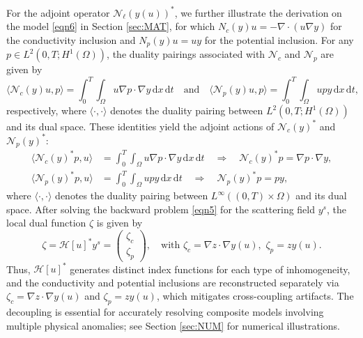 \documentclass[onefignum,onetabnum]{siamart190516}
\numberwithin{equation}{section}
\begin{document}
For the adjoint operator $\mathcal{N}_{\ell}(y(u))^{*}$, we further illustrate the derivation on the model \eqref{eqn6} in Section \ref{sec:MAT}, for which $N_{c}(y)u = -\nabla \cdot (u \nabla y)$ for the conductivity inclusion and $N_{p}(y)u = u y$ for the potential inclusion.
For any $p \in L^{2}(0,T; H^{1}(\Omega))$, the duality pairings associated with $\mathcal{N}_{c}$ and $\mathcal{N}_{p}$ are given by
\begin{equation*}
\langle \mathcal{N}_{c}(y)u, p \rangle = \int_{0}^{T} \int_{\Omega} u \nabla p \cdot \nabla y \, \mathrm{d}x \, \mathrm{d}t \quad \text{and} \quad \langle \mathcal{N}_{p}(y)u, p \rangle = \int_{0}^{T} \int_{\Omega} u p y \, \mathrm{d}x \, \mathrm{d}t,
\end{equation*}
respectively,
where $\langle \cdot, \cdot \rangle$ denotes the duality pairing between $L^{2}(0,T; H^{1}(\Omega))$ and its dual space.
These identities yield the adjoint actions of $\mathcal{N}_{c}(y)^{*}$ and $\mathcal{N}_{p}(y)^{*}$:
\begin{equation*}
\begin{aligned}
\langle \mathcal{N}_{c}(y)^{*} p, u \rangle &= \int_{0}^{T} \int_{\Omega} u \nabla p \cdot \nabla y \, \mathrm{d}x \, \mathrm{d}t \quad \Rightarrow \quad \mathcal{N}_{c}(y)^{*} p = \nabla p \cdot \nabla y, \\
\langle \mathcal{N}_{p}(y)^{*} p, u \rangle &= \int_{0}^{T} \int_{\Omega} u p y \, \mathrm{d}x \, \mathrm{d}t \quad \Rightarrow \quad \mathcal{N}_{p}(y)^{*} p = p y,
\end{aligned}
\end{equation*}
where $\langle \cdot, \cdot \rangle$ denotes the duality pairing between $L^{\infty}((0, T) \times \Omega)$ and its dual space.
After solving the backward problem \eqref{eqn5} for the scattering field $y^{s}$, the local dual function $\zeta$ is given by
\begin{equation}
\zeta = \mathcal{H}[u]^{*}
y^{s}
= \begin{pmatrix}
\zeta_{c} \\
\zeta_p
\end{pmatrix},
\quad \text{with }
\zeta_{c} = \nabla z \cdot \nabla y(u),\,\,
\zeta_p = z y(u).
\label{eqn15}
\end{equation}
Thus, $\mathcal{H}[u]^{*}$ generates distinct index functions for each type of inhomogeneity, and the conductivity and potential inclusions are reconstructed separately via $\zeta_c = \nabla z \cdot \nabla y(u)$ and $\zeta_p = z y(u)$, which mitigates cross-coupling artifacts.
The decoupling is essential for accurately resolving composite models involving multiple physical anomalies; see Section \ref{sec:NUM} for numerical illustrations.
\end{document}
